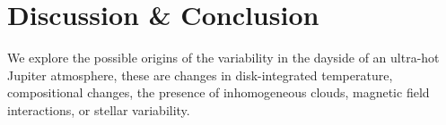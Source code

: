 \section{Discussion \& Conclusion}



We explore the possible origins of the variability in the dayside of an ultra-hot Jupiter atmosphere, these are changes in disk-integrated temperature, compositional changes, the presence of inhomogeneous clouds, magnetic field interactions, or stellar variability.

